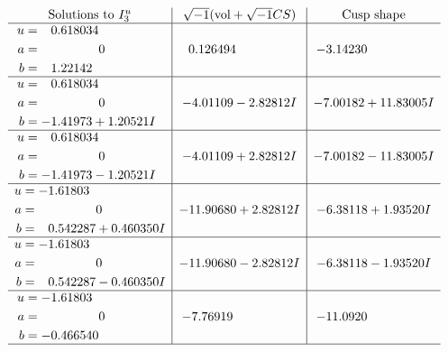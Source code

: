 \documentclass[1p]{elsarticle_modified}
\theoremstyle{definition}
\newcommand{\I}{\sqrt{-1}}
\begin{document}
$$\begin{array}{c|c|c}  
\text{Solutions to }I^u_{3}& \I (\text{vol} + \sqrt{-1}CS) & \text{Cusp shape}\\
 \hline 
\begin{aligned}
u &= \phantom{-}0.618034\phantom{ +0.000000I} \\
a &= \phantom{-0.000000 } 0 \\
b &= \phantom{-}1.22142\phantom{ +0.000000I}\end{aligned}
 & \phantom{-}0.126494\phantom{ +0.000000I} & -3.14230\phantom{ +0.000000I} \\ \hline\begin{aligned}
u &= \phantom{-}0.618034\phantom{ +0.000000I} \\
a &= \phantom{-0.000000 } 0 \\
b &= -1.41973 + 1.20521 I\end{aligned}
 & -4.01109 - 2.82812 I & -7.00182 + 11.83005 I \\ \hline\begin{aligned}
u &= \phantom{-}0.618034\phantom{ +0.000000I} \\
a &= \phantom{-0.000000 } 0 \\
b &= -1.41973 - 1.20521 I\end{aligned}
 & -4.01109 + 2.82812 I & -7.00182 - 11.83005 I \\ \hline\begin{aligned}
u &= -1.61803\phantom{ +0.000000I} \\
a &= \phantom{-0.000000 } 0 \\
b &= \phantom{-}0.542287 + 0.460350 I\end{aligned}
 & -11.90680 + 2.82812 I & -6.38118 + 1.93520 I \\ \hline\begin{aligned}
u &= -1.61803\phantom{ +0.000000I} \\
a &= \phantom{-0.000000 } 0 \\
b &= \phantom{-}0.542287 - 0.460350 I\end{aligned}
 & -11.90680 - 2.82812 I & -6.38118 - 1.93520 I \\ \hline\begin{aligned}
u &= -1.61803\phantom{ +0.000000I} \\
a &= \phantom{-0.000000 } 0 \\
b &= -0.466540\phantom{ +0.000000I}\end{aligned}
 & -7.76919\phantom{ +0.000000I} & -11.0920\phantom{ +0.000000I}\\
 \hline 
 \end{array}$$\newpage\newpage\renewcommand{\arraystretch}{1}
\end{document}
